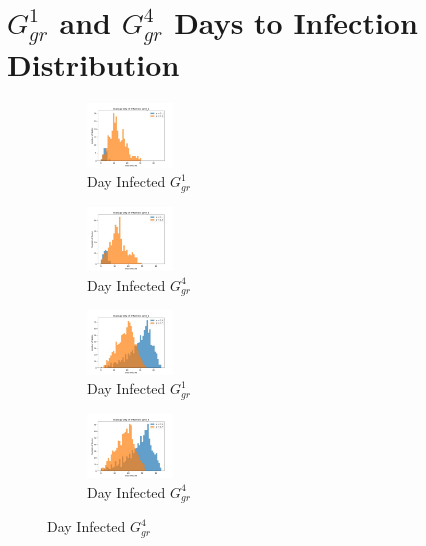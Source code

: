 \documentclass[letterpaper,11pt]{article}
\begin{document}
    \section{$G^{1}_{gr}$ and $G^{4}_{gr}$ Days to Infection Distribution}

    \begin{figure}[htpb]
        \centering
    \begin{subfigure}{.25\textwidth}
        \centering
        \includegraphics[width=0.25\textwidth]{histogram_grid_1_0_3.jpg}
        \caption{Day Infected $G^{1}_{gr}$}
        \label{fig:histogram_gr1_1_g}
    \end{subfigure}%
    \begin{subfigure}{.25\textwidth}
        \centering
        \includegraphics[width=0.25\textwidth]{histogram_grid_4_0_3.jpg}
        \caption{Day Infected $G^{4}_{gr}$}
        \label{fig:histogram_gr4_1_3}
    \end{subfigure}%

    \begin{subfigure}{.25\textwidth}
        \centering
        \includegraphics[width=0.25\textwidth]{histogram_grid_1_0_7.jpg}
        \caption{Day Infected $G^{1}_{gr}$}
        \label{fig:histogram_gr1_1_7}
    \end{subfigure}%
    \begin{subfigure}{.25\textwidth}
        \centering
        \includegraphics[width=0.25\textwidth]{histogram_grid_4_0_7.jpg}
        \caption{Day Infected $G^{4}_{gr}$}
        \label{fig:histogram_gr4_1_7}
    \end{subfigure}
    \end{figure}
\end{document}
